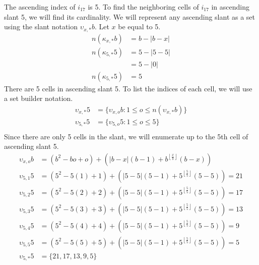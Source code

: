 \documentclass[letterpaper, twoside,12pt]{book}
\begin{document}
    The ascending index of $i_{17}$ is 5. To find the neighboring cells of $i_{17}$ in ascending slant 5, we will find its cardinality. We will represent any ascending slant as a set using the slant notation $\upsilon_{x,*}b$. Let $x$ be equal to 5.
    \begin{equation*}
        \begin{split}
            n(\kappa_{x,*}b) &= b - |b - x| \\
            n(\kappa_{5,*}5) &= 5 - |5 - 5| \\
                &= 5 - |0| \\
            n(\kappa_{5,*}5) &= 5
        \end{split}
    \end{equation*}
    There are 5 cells in ascending slant 5. To list the indices of each cell, we will use a set builder notation.
    \begin{equation*}
        \begin{split}
            \upsilon_{x,*}5 &= \{ \upsilon_{x,o}b : 1 \leq o \leq n(\upsilon_{x,*}b) \} \\
            \upsilon_{5,*}5 &= \{ \upsilon_{5,o}5 : 1 \leq o \leq 5 \} \\
        \end{split}
    \end{equation*}
    Since there are only 5 cells in the slant, we will enumerate up to the 5th cell of ascending slant 5.
    \begin{equation*}
        \begin{split}
            \upsilon_{x,o}b &= (b^2 - bo + o) + (|b-x|(b-1)+ b^{\left\lfloor \frac{x}{b} \right\rfloor}(b-x)) \\
            \upsilon_{5,1}5 &= (5^2 - 5(1) + 1) + (|5-5|(5-1)+ 5^{\left\lfloor \frac{5}{5} \right\rfloor}(5-5)) = 21\\
            \upsilon_{5,2}5 &= (5^2 - 5(2) + 2) + (|5-5|(5-1)+ 5^{\left\lfloor \frac{5}{5} \right\rfloor}(5-5)) = 17\\
            \upsilon_{5,3}5 &= (5^2 - 5(3) + 3) + (|5-5|(5-1)+ 5^{\left\lfloor \frac{5}{5} \right\rfloor}(5-5)) = 13\\
            \upsilon_{5,4}5 &= (5^2 - 5(4) + 4) + (|5-5|(5-1)+ 5^{\left\lfloor \frac{5}{5} \right\rfloor}(5-5)) = 9\\
            \upsilon_{5,5}5 &= (5^2 - 5(5) + 5) + (|5-5|(5-1)+ 5^{\left\lfloor \frac{5}{5} \right\rfloor}(5-5)) = 5\\
            \upsilon_{5,*}5 &= \{21, 17, 13, 9, 5\}
        \end{split}
    \end{equation*}
\end{document}
